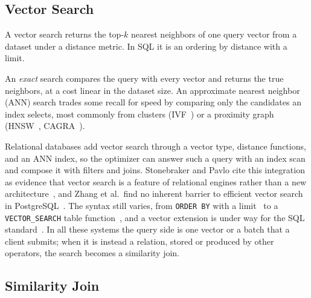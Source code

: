\subsection{Vector Search}\label{subsec:vector-search}


A vector search returns the top-$k$ nearest neighbors of one query vector from a dataset under a distance metric.
In SQL it is an ordering by distance with a limit.

An \textit{exact} search compares the query with every vector and returns the true neighbors, at a cost linear in the dataset size.
An approximate nearest neighbor (ANN) search trades some recall for speed by comparing only the candidates an index selects, most commonly from clusters (IVF~\cite{JegouPQ11}) or a proximity graph (HNSW~\cite{MalkovYashunin20}, CAGRA~\cite{OotomoCAGRA24}).

Relational databases add vector search through a vector type, distance functions, and an ANN index, so the optimizer can answer such a query with an index scan and compose it with filters and joins.
Stonebraker and Pavlo cite this integration as evidence that vector search is a feature of relational engines rather than a new architecture~\cite{StonebrakerPavloAround24}, and Zhang et al.\ find no inherent barrier to efficient vector search in PostgreSQL~\cite{ZhangPgLimits24}.
The syntax still varies, from \texttt{ORDER BY} with a limit~\cite{PgvectorRepo, DuckDBVSS, OracleAIVectorSearch} to a \texttt{VECTOR\_SEARCH} table function~\cite{BigQueryVectorSearchFn, SQLServerVectorSearchFn, DatabricksVectorSearchFn26}, and a vector extension is under way for the SQL standard~\cite{EisentrautSQL202y25}.
In all these systems the query side is one vector or a batch that a client submits; when it is instead a relation, stored or produced by other operators, the search becomes a similarity join.

\subsection{Similarity Join}\label{subsec:similarity-join}


